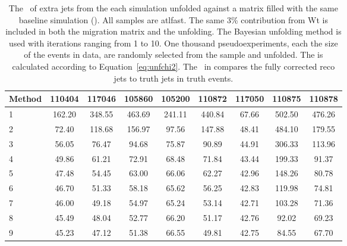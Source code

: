 \begin{center}
\begin{table}
\begin{tabular}{|l|c|c|c|c|c|c|c|c|}
\hline
 Method & 110404 & 117046 & 105860 & 105200 & 110872 & 117050 & 110875 & 110878\\
\hline
1& 162.20 & 348.55 & 463.69 & 241.11 & 440.84 & 67.66 & 502.50 & 476.26 \\ 
2& 72.40 & 118.68 & 156.97 & 97.56 & 147.88 & 48.41 & 484.10 & 179.55 \\ 
3& 56.05 & 76.47 & 94.68 & 75.87 & 90.89 & 44.91 & 306.33 & 113.96 \\ 
4& 49.86 & 61.21 & 72.91 & 68.48 & 71.84 & 43.44 & 199.33 & 91.37 \\ 
5& 47.48 & 54.45 & 63.00 & 66.06 & 62.27 & 42.96 & 148.26 & 80.78 \\ 
6& 46.70 & 51.33 & 58.18 & 65.62 & 56.25 & 42.83 & 119.98 & 74.81 \\ 
7& 46.00 & 49.18 & 54.97 & 65.24 & 53.14 & 42.71 & 103.28 & 71.36 \\ 
8& 45.49 & 48.04 & 52.77 & 66.20 & 51.17 & 42.76 & 92.02 & 69.23 \\ 
9& 45.23 & 47.12 & 51.38 & 66.55 & 49.81 & 42.75 & 84.55 & 67.70 \\ 
\hline
\end{tabular}
\caption{The \chisq\ of extra jets from the each \ttbar simulation unfolded against a matrix filled with the same baseline \ttbar simulation (\powpy). All samples are atlfast. The same 3\% contribution from Wt is included in both the migration matrix and the unfolding. The Bayesian unfolding method is used with iterations ranging from 1 to 10. One thousand pseudoexperiments, each the size of the events in data, are randomly selected from the sample and unfolded. The \chisq is calculated according to Equation~\ref{eq:unfchi2}. 
The \chisq\ in compares the fully corrected reco jets to truth jets in truth events.}
\end{table}
\label{t:stresschi}
\end{center}
\clearpage

